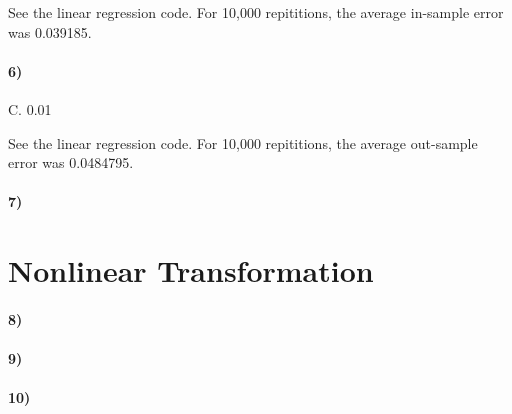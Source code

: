 \documentclass[10pt,letter]{article}
\begin{document}
	See the linear regression code. For 10,000 repititions, the average in-sample error was 0.039185. 

\paragraph{6)} C. 0.01

	See the linear regression code. For 10,000 repititions, the average out-sample error was 0.0484795.

\paragraph{7)}

\section*{Nonlinear Transformation}

\paragraph{8)}

\paragraph{9)}

\paragraph{10)}
\end{document}
